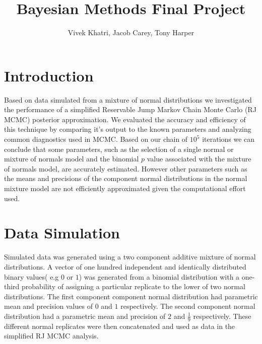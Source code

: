 \documentclass[12pt]{article}
\title{Bayesian Methods Final Project}
\author{Vivek Khatri, Jacob Carey, Tony Harper}
\date{}
\begin{document}
\section*{Introduction} 

Based on data simulated from a mixture of normal distributions we investigated the performance of a simplified Reservable Jump Markov Chain Monte Carlo (RJ MCMC) posterior approximation. We evaluated the accuracy and efficiency of this technique by comparing it's output  to the known parameters and analyzing common diagnostics used in MCMC. Based on our chain of $10^5$ iterations we can conclude that some parameters, such as the selection of a single normal or mixture of normals model and the binomial $p$ value associated with the mixture of normals model, are accurately estimated. However other parameters such as the means and precisions of the component  normal distributions in the normal mixture model are not efficiently approximated given the computational effort used.

\section*{Data Simulation}
Simulated data was generated using a two component additive mixture of normal distributions.  A vector of one hundred independent and identically distributed binary values( e.g $0$ or $1$) was generated from a binomial distribution with a one-third probability of assigning a particular replicate to the lower of two normal distributions. The first component component normal distribution had parametric mean and precision values of $0$ and $1$ respectively. The second component normal distribution had a parametric mean and precision of $2$ and $\frac{1}{9}$ respectively. These different normal replicates were then concatenated and used as data in the simplified RJ MCMC analysis.
\end{document}
